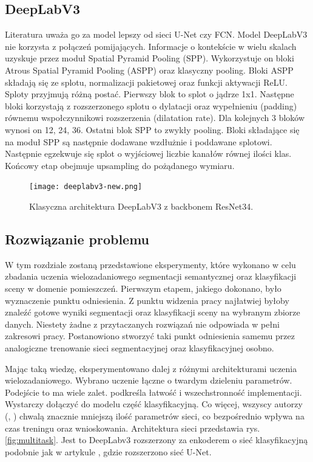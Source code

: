 \subsection{DeepLabV3}
Literatura uważa go za model lepszy od sieci U-Net czy FCN. Model DeepLabV3 nie korzysta z połączeń pomijających. Informacje o kontekście w wielu skalach uzyskuje przez moduł Spatial Pyramid Pooling (SPP). Wykorzystuje on bloki Atrous Spatial Pyramid Pooling (ASPP) oraz klasyczny pooling. Bloki ASPP składają się ze splotu, normalizacji pakietowej oraz funkcji aktywacji ReLU. Sploty przyjmują różną postać. Pierwszy blok to splot o jądrze 1x1. Następne bloki korzystają z rozszerzonego splotu o dylatacji oraz wypełnieniu (padding) równemu wspołczynnikowi rozszerzenia (dilatation rate). Dla kolejnych 3 bloków wynosi on 12, 24, 36. Ostatni blok SPP to zwykły pooling. Bloki składające się na moduł SPP są następnie dodawane wzdłużnie i poddawane splotowi. Następnie egzekwuje się splot o wyjściowej liczbie kanałów równej ilości klas. Końcowy etap obejmuje upsampling do pożądanego wymiaru.
\begin{figure}[ht!]
    \texttt{[image: deeplabv3-new.png]}
    \caption{Klasyczna architektura DeepLabV3 z backbonem ResNet34.}
    \label{fig:deeplabv3}
\end{figure}


\subsection{Rozwiązanie problemu}
W tym rozdziale zostaną przedstawione eksperymenty, które wykonano w celu zbadania uczenia wielozadaniowego segmentacji semantycznej oraz klasyfikacji sceny w domenie pomieszczeń. Pierwszym etapem, jakiego dokonano, było wyznaczenie punktu odniesienia. Z punktu widzenia pracy najłatwiej byłoby znaleźć gotowe wyniki segmentacji oraz klasyfikacji sceny na wybranym zbiorze danych. Niestety żadne z przytaczanych rozwiązań nie odpowiada w pełni zakresowi pracy. Postanowiono stworzyć taki punkt odniesienia samemu przez analogiczne trenowanie sieci segmentacyjnej oraz klasyfikacyjnej osobno.

Mając taką wiedzę, eksperymentowano dalej z różnymi architekturami uczenia wielozadaniowego. Wybrano uczenie łączne o twardym dzieleniu parametrów. Podejście to ma wiele zalet. \cite{mehta2018net} podkreśla łatwość i wszechstronność implementacji. Wystarczy dołączyć do modelu część klasyfikacyjną. Co więcej, wszyscy autorzy (\cite{mehta2018net}, \cite{9892852}) chwalą znacznie mniejszą ilość parametrów sieci, co bezpośrednio wpływa na czas treningu oraz wnioskowania. Architektura sieci przedstawia rys. \ref{fig:multitask}. Jest to DeepLabv3 rozszerzony za enkoderem o sieć klasyfikacyjną podobnie jak w artykule \cite{mehta2018net}, gdzie rozszerzono sieć U-Net.

